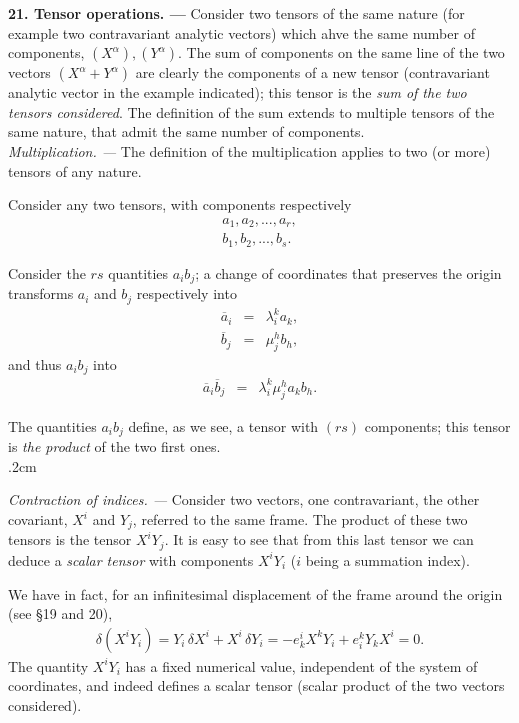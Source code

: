 

{\bf 21. Tensor operations. --- }
% 
Consider two tensors of the same nature (for example two contravariant analytic vectors) which ahve the same number of components, $(X^\alpha), (Y^\alpha)$. The sum of components on the same line of the two vectors $(X^\alpha + Y^\alpha)$ are clearly the components of a new tensor (contravariant analytic vector in the example indicated); this tensor is the {\em sum of the two tensors considered}. The definition of the sum extends to multiple tensors of the same nature, that admit the same number of components.
\ \\[.2cm]

{\em Multiplication. --- } 
The definition of the multiplication applies to two (or more) tensors of any nature.

Consider any two tensors, with components respectively
\begin{eqnarray*}
a_1, a_2, ..., a_r, \\
b_1, b_2, ..., b_s. 
\end{eqnarray*}

Consider the $rs$ quantities $a_ib_j$; a change of coordinates that preserves the origin transforms $a_i$ and $b_j$ respectively into
\begin{eqnarray*}
\overline a_i &=& \lambda^k_i a_k,  \\
\overline b_j &=& \mu^h_j b_h,  
\end{eqnarray*}
and thus $a_i b_j$ into 
\begin{eqnarray*}
\overline a_i \overline b_j  &=& \lambda^k_i \mu^h_j a_k b_h.  
\end{eqnarray*}

The quantities $a_i b_j$ define, as we see, a tensor with $(rs)$ components; this tensor is {\em the product} of the two first ones. 
\ \\{.2cm}

{\em Contraction of indices. --- }
Consider two vectors, one contravariant, the other covariant, $X^i$ and $Y_j$, referred to the same frame. The product of these two tensors is the tensor $X^iY_j$. It is easy to see that from this last tensor we can deduce a {\em scalar tensor} with components $X^iY_i$ ($i$ being a summation index).

We have in fact, for an infinitesimal displacement of the frame around the origin (see \S 19 and 20),
\begin{eqnarray*}
\delta(X^i Y_i) = Y_i\, \delta X^i + X^i\, \delta Y_i = - e^i_k X^k Y_i + e^k_i Y_k X^i = 0.
\end{eqnarray*}
The quantity $X^i Y_i$ has a fixed numerical value, independent of the system of coordinates, and indeed defines a scalar tensor (scalar product of the two vectors considered).

